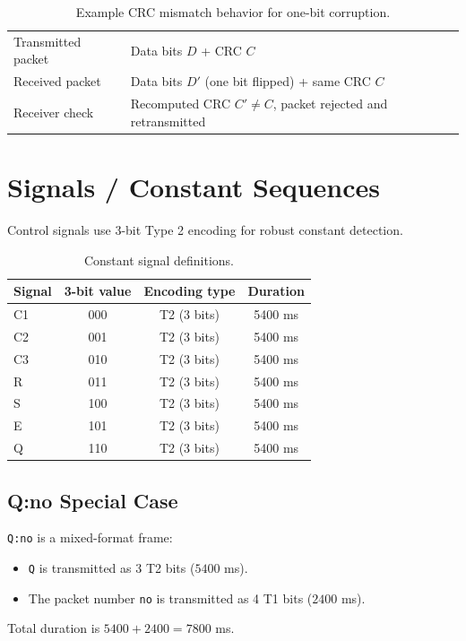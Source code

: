 \documentclass[10pt,a4paper]{article}
\begin{document}
\begin{table}[H]
\centering
\caption{Example CRC mismatch behavior for one-bit corruption.}
\begin{tabular}{ll}
\toprule
Transmitted packet & Data bits \(D\) + CRC \(C\) \\
Received packet & Data bits \(D'\) (one bit flipped) + same CRC \(C\) \\
Receiver check & Recomputed CRC \(C' \neq C\), packet rejected and retransmitted \\
\bottomrule
\end{tabular}
\end{table}

\section{Signals / Constant Sequences}
Control signals use 3-bit Type 2 encoding for robust constant detection.

\begin{table}[H]
\centering
\caption{Constant signal definitions.}
\begin{tabular}{lccc}
\toprule
Signal & 3-bit value & Encoding type & Duration \\
\midrule
C1 & 000 & T2 (3 bits) & 5400 ms \\
C2 & 001 & T2 (3 bits) & 5400 ms \\
C3 & 010 & T2 (3 bits) & 5400 ms \\
R  & 011 & T2 (3 bits) & 5400 ms \\
S  & 100 & T2 (3 bits) & 5400 ms \\
E  & 101 & T2 (3 bits) & 5400 ms \\
Q  & 110 & T2 (3 bits) & 5400 ms \\
\bottomrule
\end{tabular}
\end{table}

\subsection*{Q:no Special Case}
\texttt{Q:no} is a mixed-format frame:
\begin{itemize}
\item \texttt{Q} is transmitted as 3 T2 bits (\(5400\) ms).
\item The packet number \texttt{no} is transmitted as 4 T1 bits (\(2400\) ms).
\end{itemize}
Total duration is \(5400 + 2400 = 7800\) ms.
\end{document}
